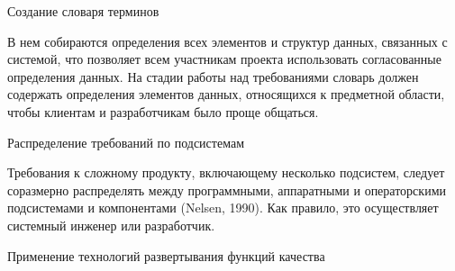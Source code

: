 \documentclass{../industrial-development}
\begin{document}
\lecturenotes

\alert{Создание словаря терминов}

В нем собираются определения всех элементов и структур данных, связанных с системой, что позволяет всем участникам проекта использовать согласованные определения данных. На стадии работы над требованиями словарь должен содержать определения элементов данных, относящихся к предметной области, чтобы клиентам и разработчикам было проще общаться.

\alert{Распределение требований по подсистемам}

Требования к сложному продукту, включающему несколько подсистем, следует соразмерно распределять между программными, аппаратными и операторскими подсистемами и компонентами (Nelsen, 1990). Как правило, это осуществляет системный инженер или разработчик.

\alert{Применение технологий развертывания функций качества}
\end{document}
